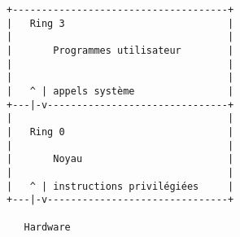 \begin{Verbatim}
+-------------------------------------+
|   Ring 3                            |
|                                     |
|       Programmes utilisateur        |
|                                     |
|                                     |
|   ^ | appels système                |
+---|-v-------------------------------+
|                                     |
|   Ring 0                            |
|                                     |
|       Noyau                         |
|                                     |
|   ^ | instructions privilégiées     |
+---|-v-------------------------------+

   Hardware
\end{Verbatim}


